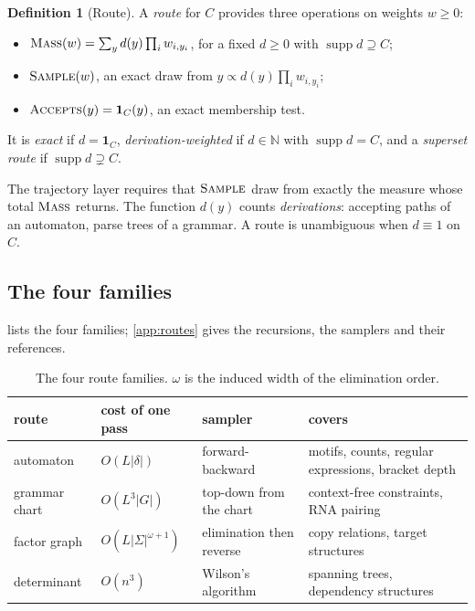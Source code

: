 \documentclass[11pt]{article}
\theoremstyle{definition}
\newtheorem{definition}[theorem]{Definition}
\newcommand{\one}{\mathbf{1}}
\newcommand{\op}[1]{\textup{\textsc{#1}}}
\begin{document}
\begin{definition}[Route]\label{def:route}
A \emph{route} for $C$ provides three operations on weights $w\ge0$:
\begin{itemize}[nosep]
  \item $\op{Mass}(w)=\sum_yd(y)\prod_iw_{i,y_i}$, for a fixed $d\ge0$ with $\operatorname{supp}d\supseteq C$;
  \item $\op{Sample}(w)$, an exact draw from $y\propto d(y)\prod_iw_{i,y_i}$;
  \item $\op{Accepts}(y)=\one_C(y)$, an exact membership test.
\end{itemize}
It is \emph{exact} if $d=\one_C$, \emph{derivation-weighted} if $d\in\mathbb N$ with $\operatorname{supp}d=C$, and
a \emph{superset route} if $\operatorname{supp}d\supsetneq C$.
\end{definition}

The trajectory layer requires that $\op{Sample}$ draw from exactly the measure whose total $\op{Mass}$ returns.
The function $d(y)$ counts \emph{derivations}: accepting paths of an automaton, parse trees of a grammar. A route
is unambiguous when $d\equiv1$ on $C$.

\subsection{The four families}
 lists the four families; \cref{app:routes} gives the recursions, the samplers and their references.

\begin{table}[h]\centering\small
\renewcommand{\arraystretch}{1.2}
\begin{tabular}{llll}
\toprule
route & cost of one pass & sampler & covers \\
\midrule
automaton & $O(L|\delta|)$ & forward-backward & motifs, counts, regular expressions, bracket depth\\
grammar chart & $O(L^3|G|)$ & top-down from the chart & context-free constraints, RNA pairing\\
factor graph \cite{kschischang2001} & $O(L|\Sigma|^{\omega+1})$ & elimination then reverse & copy relations, target structures\\
determinant & $O(n^3)$ & Wilson's algorithm & spanning trees, dependency structures\\
\bottomrule
\end{tabular}
\caption{The four route families. $\omega$ is the induced width of the elimination order.}\label{tab:routes}
\end{table}
\end{document}
